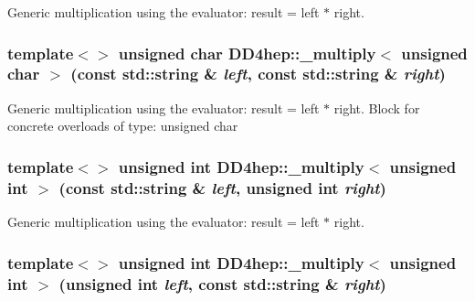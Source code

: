 Generic multiplication using the evaluator: result = left $\ast$ right. \hypertarget{group___d_d4_h_e_p___g_e_o_m_e_t_r_y_gab0d556cb2dc231ae51cf6ac6d6608be1}{
\subsubsection[{\_\-multiply$<$ unsigned char $>$}]{\setlength{\rightskip}{0pt plus 5cm}template$<$$>$ unsigned char DD4hep::\_\-multiply$<$ unsigned char $>$ (const std::string \& {\em left}, \/  const std::string \& {\em right})}}
\label{group___d_d4_h_e_p___g_e_o_m_e_t_r_y_gab0d556cb2dc231ae51cf6ac6d6608be1}


Generic multiplication using the evaluator: result = left $\ast$ right. Block for concrete overloads of type: unsigned char \hypertarget{group___d_d4_h_e_p___g_e_o_m_e_t_r_y_ga730223da6400b68727363b3e0af02295}{
\subsubsection[{\_\-multiply$<$ unsigned int $>$}]{\setlength{\rightskip}{0pt plus 5cm}template$<$$>$ unsigned int DD4hep::\_\-multiply$<$ unsigned int $>$ (const std::string \& {\em left}, \/  unsigned int {\em right})}}
\label{group___d_d4_h_e_p___g_e_o_m_e_t_r_y_ga730223da6400b68727363b3e0af02295}


Generic multiplication using the evaluator: result = left $\ast$ right. \hypertarget{group___d_d4_h_e_p___g_e_o_m_e_t_r_y_ga90d32d251543997f58bfe3d928d2a1eb}{
\subsubsection[{\_\-multiply$<$ unsigned int $>$}]{\setlength{\rightskip}{0pt plus 5cm}template$<$$>$ unsigned int DD4hep::\_\-multiply$<$ unsigned int $>$ (unsigned int {\em left}, \/  const std::string \& {\em right})}}
\label{group___d_d4_h_e_p___g_e_o_m_e_t_r_y_ga90d32d251543997f58bfe3d928d2a1eb}


